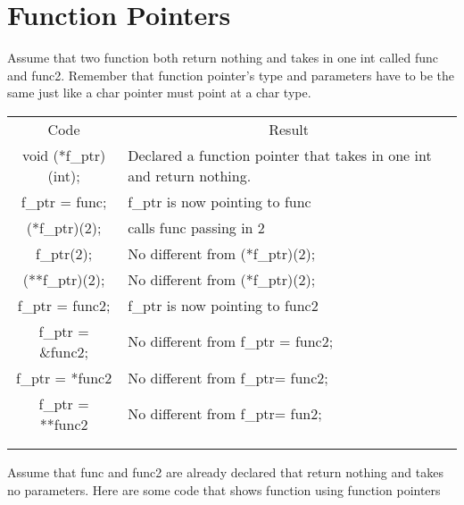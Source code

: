 \documentclass{article}
\begin{document}
\section{Function Pointers}
Assume that two function both return nothing and takes in one int called func and func2. Remember that function pointer's type and parameters have to be the same just like a char pointer must point at a char type. \\

\begin{table}[h]
\begin{tabular}{cl}
Code                 & \multicolumn{1}{c}{Result}                                            \\
void (*f\_ptr)(int); & Declared a function pointer that takes in one int and return nothing. \\
f\_ptr = func;       & f\_ptr is now pointing to func                                        \\
(*f\_ptr)(2);        & calls func passing in 2                                               \\
f\_ptr(2);           & No different from (*f\_ptr)(2);                                       \\
(**f\_ptr)(2);       & No different from (*f\_ptr)(2);                                       \\
f\_ptr = func2;      & f\_ptr is now pointing to func2                                       \\
f\_ptr = \&func2;    & No different from f\_ptr = func2;                                     \\
f\_ptr = *func2      & No different from f\_ptr= func2;                                      \\
f\_ptr = **func2     & No different from f\_ptr= fun2;                                       \\
\multicolumn{1}{l}{} &                                                                       \\
\multicolumn{1}{l}{} &                                                                      
\end{tabular}
\end{table}
Assume that func and func2 are already declared that return nothing and takes no parameters. Here are some code that shows function using function pointers\\
\end{document}
